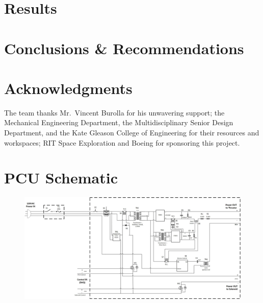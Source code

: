 \documentclass[journal]{IEEEtran}
\begin{document}
\section{Results}

\section{Conclusions \& Recommendations}

\section*{Acknowledgments}
The team thanks Mr.~Vincent Burolla for his unwavering support; the Mechanical Engineering Department, the Multidisciplinary Senior Design Department, and the Kate Gleason College of Engineering for their resources and workspaces; RIT Space Exploration and Boeing for sponsoring this project.





\onecolumn
\appendices{}
\section{PCU Schematic}
\begin{figure}[h!]
  \centering
  \includegraphics[angle=90,height=.9\vsize,keepaspectratio]{figs/PCU.jpg}
\end{figure}
\end{document}
